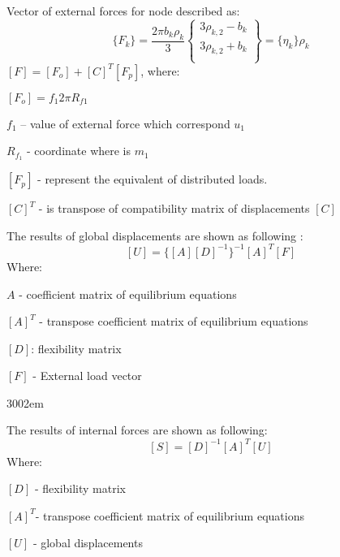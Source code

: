 Vector of external forces for node described as:
\begin{equation}\label{eqn:ExtrLoad}
    \{F_k\}=
    \frac{2\pi b_k\rho_k}{3}
    \left\{\begin{matrix}
        3\rho_{k,2}-b_k \\[2ex]
        3\rho_{k,2}+b_k \\[2ex]
    \end{matrix}\right\}
    =
    \{\eta_k\}\rho_k
\end{equation}
$[F]=[F_o]+[C]^T[F_p]$, where:\par
$[F_o]=f_1 2\pi R_{f1} $\par
$f_1$ – value of external force which correspond $u_1$\par
$R_{f_1}$ - coordinate where is $m_1$\par
$[F_p]$ - represent the equivalent of distributed loads.\par
$[C]^T$ - is transpose of compatibility matrix of displacements $[C]$\par
{\noindent \footnotesize }
The results of global displacements are shown as following : 
\begin{equation}\label{eqn:Uglob}
    [U]=\{[A][D]^{-1}\}^{-1}[A]^T[F]
\end{equation}
Where:\par
$A$ - coefficient matrix of equilibrium equations\par
$[A]^T$ - transpose coefficient matrix of equilibrium equations\par
$[D]$: flexibility matrix\par
$[F]$ - External load vector\par
\begin{xtolerant}{300}{2em}
    {\noindent \footnotesize }
  \end{xtolerant}
\par
The results of internal forces are shown as following: 
\begin{equation}\label{eqn:Ulocal}
    [S]=[D]^{-1}[A]^T[U]
\end{equation}
Where:\par
$[D]$ - flexibility matrix \par 
$[A]^T$- transpose coefficient matrix of equilibrium equations\par 
$[U]$ - global displacements\par
